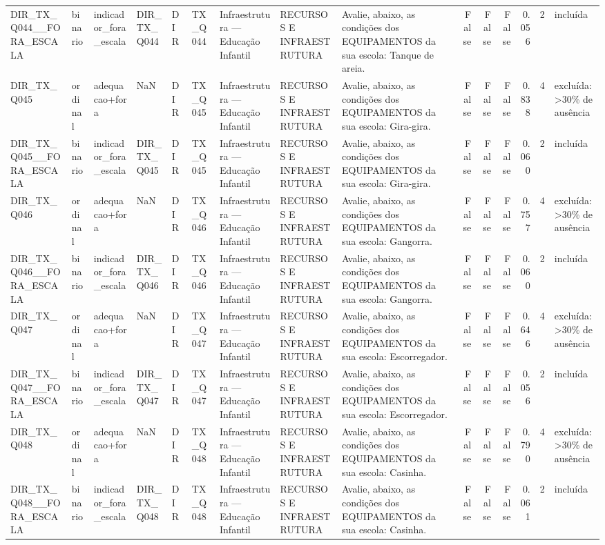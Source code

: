 \begin{tabular}{lllllllllrrrrrl}
DIR\_TX\_Q044\_\_FORA\_ESCALA & binario & indicador\_fora\_escala & DIR\_TX\_Q044 & DIR & TX\_Q044 & Infraestrutura — Educação Infantil & RECURSOS E INFRAESTRUTURA & Avalie, abaixo, as condições dos EQUIPAMENTOS da sua escola: Tanque de areia. & False & False & False & 0.056 & 2 & incluída \\
DIR\_TX\_Q045 & ordinal & adequacao+fora & NaN & DIR & TX\_Q045 & Infraestrutura — Educação Infantil & RECURSOS E INFRAESTRUTURA & Avalie, abaixo, as condições dos EQUIPAMENTOS da sua escola: Gira-gira. & False & False & False & 0.838 & 4 & excluída: >30\% de ausência \\
DIR\_TX\_Q045\_\_FORA\_ESCALA & binario & indicador\_fora\_escala & DIR\_TX\_Q045 & DIR & TX\_Q045 & Infraestrutura — Educação Infantil & RECURSOS E INFRAESTRUTURA & Avalie, abaixo, as condições dos EQUIPAMENTOS da sua escola: Gira-gira. & False & False & False & 0.060 & 2 & incluída \\
DIR\_TX\_Q046 & ordinal & adequacao+fora & NaN & DIR & TX\_Q046 & Infraestrutura — Educação Infantil & RECURSOS E INFRAESTRUTURA & Avalie, abaixo, as condições dos EQUIPAMENTOS da sua escola: Gangorra. & False & False & False & 0.757 & 4 & excluída: >30\% de ausência \\
DIR\_TX\_Q046\_\_FORA\_ESCALA & binario & indicador\_fora\_escala & DIR\_TX\_Q046 & DIR & TX\_Q046 & Infraestrutura — Educação Infantil & RECURSOS E INFRAESTRUTURA & Avalie, abaixo, as condições dos EQUIPAMENTOS da sua escola: Gangorra. & False & False & False & 0.060 & 2 & incluída \\
DIR\_TX\_Q047 & ordinal & adequacao+fora & NaN & DIR & TX\_Q047 & Infraestrutura — Educação Infantil & RECURSOS E INFRAESTRUTURA & Avalie, abaixo, as condições dos EQUIPAMENTOS da sua escola: Escorregador. & False & False & False & 0.646 & 4 & excluída: >30\% de ausência \\
DIR\_TX\_Q047\_\_FORA\_ESCALA & binario & indicador\_fora\_escala & DIR\_TX\_Q047 & DIR & TX\_Q047 & Infraestrutura — Educação Infantil & RECURSOS E INFRAESTRUTURA & Avalie, abaixo, as condições dos EQUIPAMENTOS da sua escola: Escorregador. & False & False & False & 0.056 & 2 & incluída \\
DIR\_TX\_Q048 & ordinal & adequacao+fora & NaN & DIR & TX\_Q048 & Infraestrutura — Educação Infantil & RECURSOS E INFRAESTRUTURA & Avalie, abaixo, as condições dos EQUIPAMENTOS da sua escola: Casinha. & False & False & False & 0.790 & 4 & excluída: >30\% de ausência \\
DIR\_TX\_Q048\_\_FORA\_ESCALA & binario & indicador\_fora\_escala & DIR\_TX\_Q048 & DIR & TX\_Q048 & Infraestrutura — Educação Infantil & RECURSOS E INFRAESTRUTURA & Avalie, abaixo, as condições dos EQUIPAMENTOS da sua escola: Casinha. & False & False & False & 0.061 & 2 & incluída \\

\end{tabular}
